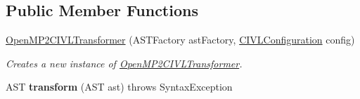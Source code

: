 \subsection*{Public Member Functions}
\begin{DoxyCompactItemize}
\item 
\hyperlink{classedu_1_1udel_1_1cis_1_1vsl_1_1civl_1_1transform_1_1IF_1_1OpenMP2CIVLTransformer_aa82d3a78895c5b0c7414db9c94d5a421}{Open\+M\+P2\+C\+I\+V\+L\+Transformer} (A\+S\+T\+Factory ast\+Factory, \hyperlink{classedu_1_1udel_1_1cis_1_1vsl_1_1civl_1_1config_1_1IF_1_1CIVLConfiguration}{C\+I\+V\+L\+Configuration} config)
\begin{DoxyCompactList}\small\item\em Creates a new instance of \hyperlink{classedu_1_1udel_1_1cis_1_1vsl_1_1civl_1_1transform_1_1IF_1_1OpenMP2CIVLTransformer}{Open\+M\+P2\+C\+I\+V\+L\+Transformer}. \end{DoxyCompactList}\item 
\hypertarget{classedu_1_1udel_1_1cis_1_1vsl_1_1civl_1_1transform_1_1IF_1_1OpenMP2CIVLTransformer_a06726cff3b1b990ca5d6c5e788433c0a}{}A\+S\+T {\bfseries transform} (A\+S\+T ast)  throws Syntax\+Exception \label{classedu_1_1udel_1_1cis_1_1vsl_1_1civl_1_1transform_1_1IF_1_1OpenMP2CIVLTransformer_a06726cff3b1b990ca5d6c5e788433c0a}

\end{DoxyCompactItemize}

